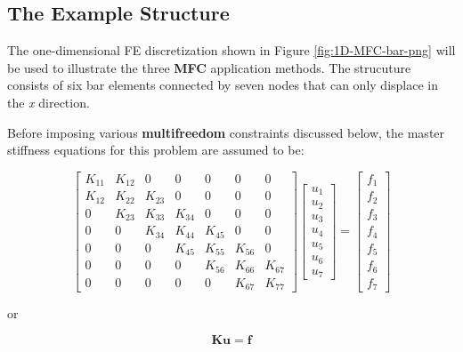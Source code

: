 \documentclass[10pt,b5paper,titlepage]{book}
\begin{document}
\subsection{The Example Structure}

The one-dimensional FE discretization shown in Figure \ref{fig:1D-MFC-bar-png}
will be used to illustrate the three \textbf{MFC} application methods. The
strucuture consists of six bar elements connected by seven nodes that can only
displace in the \textit{x} direction.

Before imposing various \textbf{multifreedom} constraints discussed below, the master
stiffness equations for this problem are assumed to be:

\begin{equation}\label{master-stiffness-6-bar}
    \begin{bmatrix}
        K_{11} & K_{12} & 0 & 0 & 0 & 0 & 0 \\
        K_{12} & K_{22} & K_{23} & 0 & 0 & 0 & 0 \\
        0 & K_{23} & K_{33} & K_{34} & 0 & 0 & 0 \\
        0 & 0 & K_{34} & K_{44} & K_{45} & 0 & 0 \\
        0 & 0 & 0 & K_{45} & K_{55} & K_{56} & 0 \\
        0 & 0 & 0 & 0 & K_{56} & K_{66} & K_{67} \\
        0 & 0 & 0 & 0 & 0 & K_{67} & K_{77}
    \end{bmatrix}
    \begin{bmatrix}
        u_1 \\
        u_2 \\
        u_3 \\
        u_4 \\
        u_5 \\
        u_6 \\
        u_7
    \end{bmatrix}
    = \begin{bmatrix}
        f_1 \\
        f_2 \\
        f_3 \\
        f_4 \\
        f_5 \\
        f_6 \\
        f_7
    \end{bmatrix}
\end{equation}

or

\begin{equation}\label{mfc-ms-master-equation}
    \mathbf{K} \mathbf{u} = \mathbf{f}
\end{equation}
\end{document}

